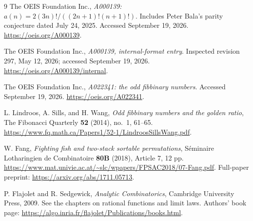 \documentclass[11pt]{article}
\theoremstyle{definition}\newtheorem{definition}[theorem]{Definition}
\theoremstyle{remark}\newtheorem{remark}[theorem]{Remark}
\begin{document}
\begin{thebibliography}{9}
The OEIS Foundation Inc.,
\emph{A000139: $a(n)=2(3n)!/((2n+1)!(n+1)!)$}.
Includes Peter Bala's parity conjecture dated July 24, 2025.
Accessed September 19, 2026.
\url{https://oeis.org/A000139}.

The OEIS Foundation Inc., \emph{A000139, internal-format entry}.
Inspected revision 297, May 12, 2026; accessed September 19, 2026.
\url{https://oeis.org/A000139/internal}.

The OEIS Foundation Inc., \emph{A022341: the odd fibbinary numbers}.
Accessed September 19, 2026.
\url{https://oeis.org/A022341}.

L. Lindroos, A. Sills, and H. Wang,
\emph{Odd fibbinary numbers and the golden ratio},
The Fibonacci Quarterly \textbf{52} (2014), no.~1, 61--65.
\url{https://www.fq.math.ca/Papers1/52-1/LindroosSillsWang.pdf}.

W. Fang, \emph{Fighting fish and two-stack sortable permutations},
S\'eminaire Lotharingien de Combinatoire \textbf{80B} (2018),
Article 7, 12 pp.
\url{https://www.mat.univie.ac.at/~slc/wpapers/FPSAC2018/07-Fang.pdf}.
Full-paper preprint: \url{https://arxiv.org/abs/1711.05713}.

P. Flajolet and R. Sedgewick, \emph{Analytic Combinatorics},
Cambridge University Press, 2009. See the chapters on rational
functions and limit laws. Authors' book page:
\url{https://algo.inria.fr/flajolet/Publications/books.html}.
\end{thebibliography}
\end{document}
